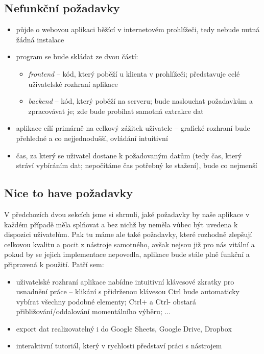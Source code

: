 \documentclass[thesis=B,czech]{FITthesis}[2012/06/26]
\begin{document}
\subsection{Nefunkční požadavky}
\begin{itemize}
	\item půjde o webovou aplikaci běžící v internetovém prohlížeči, tedy nebude nutná žádná instalace
	\item program se bude skládat ze dvou částí:
	\begin{itemize}
		\item \emph{frontend} -- kód, který poběží u klienta v prohlížeči; představuje celé uživatelské rozhraní aplikace
		\item \emph{backend} -- kód, který poběží na serveru; bude naslouchat požadavkům a zpracovávat je; zde bude probíhat samotná extrakce dat
	\end{itemize}
	\item aplikace cílí primárně na celkový zážitek uživatele -- grafické rozhraní bude přehledné a co nejjednodušší, ovládání intuitivní
	\item čas, za který se uživatel dostane k požadovaným datům (tedy čas, který stráví vybíráním dat; nepočítáme čas potřebný ke stažení), bude co nejmenší
\end{itemize}

\subsection{Nice to have požadavky}
V předchozích dvou sekcích jsme si shrnuli, jaké požadavky by naše aplikace v každém případě měla splňovat a bez nichž by neměla vůbec být uvedena k dispozici uživatelům. Pak tu máme ale také požadavky, které rozhodně zlepšují celkovou kvalitu a pocit z nástroje samotného, avšak nejsou již pro nás vitální a pokud by se jejich implementace nepovedla, aplikace bude stále plně funkční a připravená k použití. Patří sem:
\begin{itemize}
	\item uživatelské rozhraní aplikace nabídne intuitivní klávesové zkratky pro usnadnění práce -- klikání s přidrženou klávesou \textsf{Ctrl} bude automaticky vybírat všechny podobné elementy; \textsf{Ctrl+} a \textsf{Ctrl-} obstará přibližování/oddalování momentálního výběru; ...
	\item export dat realizovatelný i do Google Sheets, Google Drive, Dropbox
	\item interaktivní tutoriál, který v rychlosti představí práci s nástrojem
\end{itemize}
\end{document}
